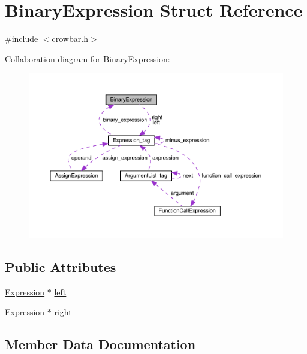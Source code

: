 \hypertarget{struct_binary_expression}{}\section{Binary\+Expression Struct Reference}
\label{struct_binary_expression}


{\ttfamily \#include $<$crowbar.\+h$>$}



Collaboration diagram for Binary\+Expression\+:\nopagebreak
\begin{figure}[H]
\begin{center}
\leavevmode
\includegraphics[width=350pt]{struct_binary_expression__coll__graph}
\end{center}
\end{figure}
\subsection*{Public Attributes}
\begin{DoxyCompactItemize}
\item 
\hyperlink{crowbar_8h_a070c6feb370aad8a9665ca315bf6ed4a}{Expression} $\ast$ \hyperlink{struct_binary_expression_aa9afb47a0f44456caa7094ff4de7e2e3}{left}
\item 
\hyperlink{crowbar_8h_a070c6feb370aad8a9665ca315bf6ed4a}{Expression} $\ast$ \hyperlink{struct_binary_expression_a22065ee718926701c8f1d70080b61636}{right}
\end{DoxyCompactItemize}


\subsection{Member Data Documentation}
\hypertarget{struct_binary_expression_aa9afb47a0f44456caa7094ff4de7e2e3}{}

